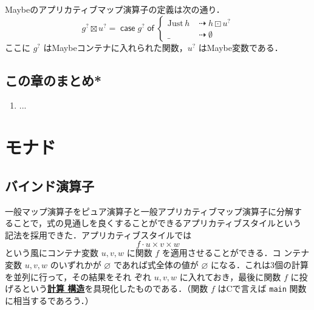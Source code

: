 \documentclass[a5paper,twoside,fleqn,draft]{jsbook}
\newcommand{\programminglanguage}[1]{\textsf{#1}}
\newcommand{\clang}{\programminglanguage{C}}
\newcommand{\keyword}[1]{{\underline{\textbf{#1}}}}
\newcommand{\code}[1]{\texttt{#1}}
\newcommand{\mKeyword}[1]{\mathsf{#1}}
\newcommand{\mIfKeyword}{\mKeyword{if}}
\newcommand{\mCaseKeyword}{\mKeyword{case}}
\newcommand{\mOfKeyword}{\mKeyword{of}}
\newcommand{\mOtherwiseKeyword}{\mKeyword{otherwise}}
\DeclareMathOperator{\mCaseKW}{\mCaseKeyword}
\DeclareMathOperator{\mIf}{\mIfKeyword}
\DeclareMathOperator{\mOfKW}{\mOfKeyword}
\DeclareMathOperator{\mOtherwise}{\mOtherwiseKeyword}
\newcommand{\mNothing}{\emptyset}
\newcommand{\mPureNothing}{\varnothing}
\DeclareMathOperator{\mAppMap}{\times}
\DeclareMathOperator{\mAppMapMaybe}{\boxtimes}
\DeclareMathOperator{\mIfSo}{\dashrightarrow}
\DeclareMathOperator{\mLogicalAnd}{\wedge}
\DeclareMathOperator{\mMap}{\cdot}
\DeclareMathOperator{\mMapMaybe}{\boxdot}
\newcommand{\mValueConstructor}[1]{\mathrm{#1}}
\newcommand{\mValueWith}[2]{\mValueConstructor{#1}\,#2}
\newcommand{\mJustWith}[1]{\mValueWith{Just}{#1}}
\newcommand{\mMaybe}[1]{{#1}^?}
\newcommand{\mCaseOf}[1]{\mCaseKW#1\mOfKW}
\begin{document}
Maybeのアプリカティブマップ演算子の定義は次の通り．
\begin{equation}
\label{eq:maybe-applicative-map-by-maybe-map}
\mMaybe{g}\mAppMapMaybe\mMaybe{u}
=\mCaseOf{\mMaybe{g}}
\begin{cases}
\mJustWith{h}&\mIfSo h\mMapMaybe\mMaybe{u}\\
\_&\mIfSo\mNothing
\end{cases}
\end{equation}
ここに $\mMaybe{g}$ はMaybeコンテナに入れられた関数，$\mMaybe{u}$ はMaybe変数である．

\section{この章のまとめ*}

\begin{enumerate}
\item ...
\end{enumerate}

\chapter{モナド}
\label{ch:monad}

\section{バインド演算子}

一般マップ演算子をピュア演算子と一般アプリカティブマップ演算子に分解す
ることで，式の見通しを良くすることができるアプリカティブスタイルという
記法を採用できた．アプリカティブスタイルでは
\begin{equation}
  f\mMap u\mAppMap v\mAppMap w
\end{equation}
という風にコンテナ変数 $u,v,w$ に関数 $f$ を適用させることができる．コ
ンテナ変数 $u,v,w$ のいずれかが $\mPureNothing$ であれば式全体の値が
$\mPureNothing$ になる．これは3個の計算を並列に行って，その結果をそれ
ぞれ $u,v,w$ に入れておき，最後に関数 $f$ に投げるという\keyword{計算
構造}を具現化したものである．（関数 $f$ は\clang で言えば
\code{main} 関数に相当するであろう．）
\end{document}

